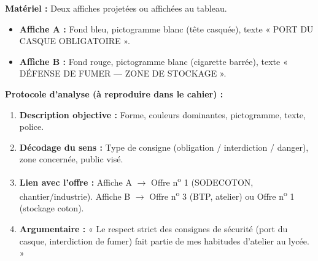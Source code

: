 \documentclass[11pt]{article}
\begin{document}
\begin{experience}
\textbf{Matériel :} Deux affiches projetées ou affichées au tableau.
\begin{itemize}
\item \textbf{Affiche A :} Fond bleu, pictogramme blanc (tête casquée), texte « PORT DU CASQUE OBLIGATOIRE ».
\item \textbf{Affiche B :} Fond rouge, pictogramme blanc (cigarette barrée), texte « DÉFENSE DE FUMER --- ZONE DE STOCKAGE ».
\end{itemize}

\textbf{Protocole d'analyse (à reproduire dans le cahier) :}
\begin{enumerate}
\item \textbf{Description objective :} Forme, couleurs dominantes, pictogramme, texte, police.
\item \textbf{Décodage du sens :} Type de consigne (obligation / interdiction / danger), zone concernée, public visé.
\item \textbf{Lien avec l'offre :} Affiche A $\rightarrow$ Offre n\textsuperscript{o} 1 (SODECOTON, chantier/industrie). Affiche B $\rightarrow$ Offre n\textsuperscript{o} 3 (BTP, atelier) ou Offre n\textsuperscript{o} 1 (stockage coton).
\item \textbf{Argumentaire :} « Le respect strict des consignes de sécurité (port du casque, interdiction de fumer) fait partie de mes habitudes d'atelier au lycée. »
\end{enumerate}


\end{experience}
\end{document}
